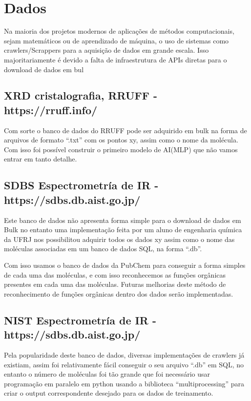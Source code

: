 \documentclass[11pt,a4paper]{article}
\begin{document}
\section{Dados}

Na maioria dos projetos modernos de aplicações de métodos computacionais, sejam matemáticos ou de aprendizado de máquina, o uso de sistemas como crawlers/Scrappers para a aquisição de dados em grande escala. Isso majoritariamente é devido a falta de infraestrutura de APIs diretas para o download de dados em bul

\subsection{XRD cristalografia, RRUFF -  https://rruff.info/ }

Com sorte o banco de dados do RRUFF pode ser adquirido em bulk na forma de arquivos de formato “.txt” com os pontos xy, assim como o nome da molécula. Com isso foi possível construir o primeiro modelo de AI(MLP) que não vamos entrar em tanto detalhe.

\subsection{SDBS Espectrometría de IR - https://sdbs.db.aist.go.jp/ }

Este banco de dados não apresenta forma simple para o download de dados em Bulk no entanto uma implementação feita por um aluno de engenharia química da UFRJ nos possibilitou adquirir todos os dados xy assim como o nome das moléculas associadas em um banco de dados SQL, na forma “.db”.

Com isso usamos o banco de dados da PubChem para conseguir a forma simples de cada uma das moléculas, e com isso reconhecemos as funções orgânicas presentes em cada uma das moléculas. 
Futuras melhorias deste método de reconhecimento de funções orgânicas dentro dos dados serão implementadas.


\subsection{NIST Espectrometría de IR - https://sdbs.db.aist.go.jp/ }

Pela popularidade deste banco de dados, diversas implementações de crawlers já existiam, assim foi relativamente fácil conseguir o seu arquivo “.db” em SQL, no entanto o número de moléculas foi tão grande que foi necessário usar programação em paralelo em python usando a biblioteca “multiprocessing” para criar o output correspondente desejado para os dados de treinamento.
\end{document}

